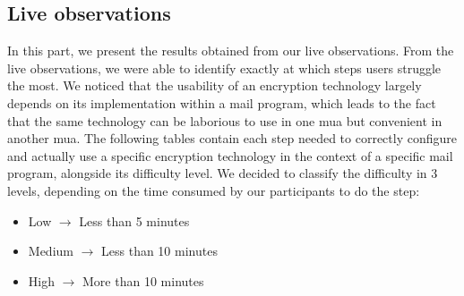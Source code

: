 \subsection{Live observations}
In this part, we present the results obtained from our live observations. From the live observations, we were able to identify exactly at which steps users struggle the most. We noticed that the usability of an encryption technology largely depends on its implementation within a mail program, which leads to the fact that the same technology can be laborious to use in one \acrshort{mua} but convenient in another \acrshort{mua}. The following tables contain each step needed to correctly configure and actually use a specific encryption technology in the context of a specific mail program, alongside its difficulty level. We decided to classify the difficulty in 3 levels, depending on the time consumed by our participants to do the step:
\begin{itemize}
	\item Low $\rightarrow$ Less than 5 minutes
	\item Medium $\rightarrow$ Less than 10 minutes
	\item High $\rightarrow$ More than 10 minutes
\end{itemize}

